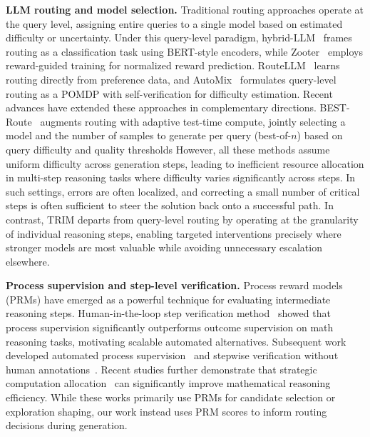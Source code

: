\documentclass{article}
\theoremstyle{plain}
\theoremstyle{definition}
\theoremstyle{remark}
\begin{document}
\textbf{LLM routing and model selection.} Traditional routing approaches operate at the query level, assigning entire queries to a single model based on estimated difficulty or uncertainty. Under this query-level paradigm, hybrid-LLM~\citep{hybridllm} frames routing as a classification task using BERT-style encoders, while Zooter~\citep{zooter} employs reward-guided training for normalized reward prediction. RouteLLM~\citep{routellm} learns routing directly from preference data, and AutoMix~\citep{automix} formulates query-level routing as a POMDP with self-verification for difficulty estimation. Recent advances have extended these approaches in complementary directions. BEST-Route~\citep{ding2025bestrouteadaptivellmrouting} augments routing with adaptive test-time compute,  jointly selecting a model and the number of samples to generate per query (best-of-$n$) based on query difficulty and quality thresholds
However, all these methods assume uniform difficulty across generation steps, leading to inefficient resource allocation in multi-step reasoning tasks where difficulty varies significantly across steps. In such settings, errors are often localized, and correcting a small number of critical steps is often sufficient to steer the solution back onto a successful path. In contrast, TRIM departs from query-level routing by operating at the granularity of individual reasoning steps, enabling targeted interventions precisely where stronger models are most valuable while avoiding unnecessary escalation elsewhere.


\textbf{Process supervision and step-level verification.} Process reward models (PRMs) have emerged as a powerful technique for evaluating intermediate reasoning steps. Human-in-the-loop step verification method~\citep{prm800k} showed that process supervision significantly outperforms outcome supervision on math reasoning tasks, motivating scalable automated alternatives. 
Subsequent work developed automated process supervision~\citep{luo2024improvemathematicalreasoninglanguage} and stepwise verification without human annotations~\citep{mathshephard}. 
Recent studies further demonstrate that strategic computation allocation~\citep{hwang-etal-2024-self, snell2024scaling, setlur2024rewarding}
can significantly improve mathematical reasoning efficiency. While these works primarily use PRMs for candidate selection or exploration shaping, our work instead uses PRM scores to inform routing decisions during generation.
\end{document}
